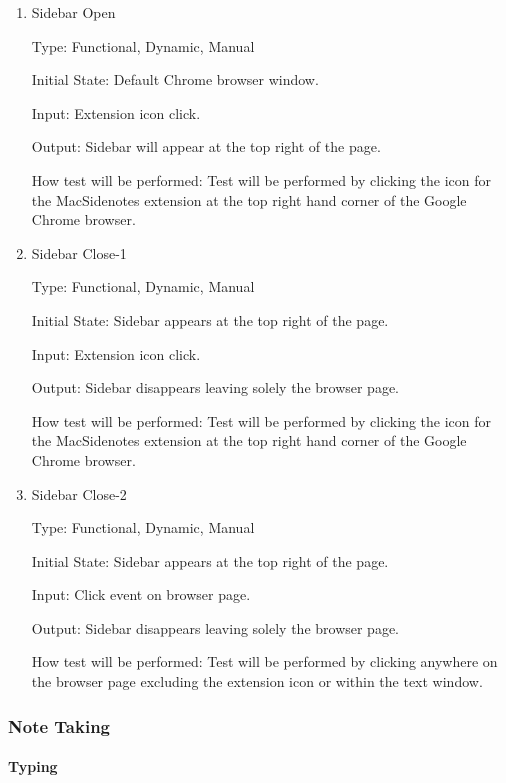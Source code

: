 \documentclass[12pt, titlepage]{article}
\begin{document}
\begin{enumerate}

\item{Sidebar Open\\}

Type: Functional, Dynamic, Manual
					
Initial State: Default Chrome browser window.
					
Input: Extension icon click.
					
Output: Sidebar will appear at the top right of the page.
					
How test will be performed: Test will be performed by clicking the icon for the 
MacSidenotes extension at the top right hand corner of the Google Chrome browser.
					
\item{Sidebar Close-1\\}

Type: Functional, Dynamic, Manual
					
Initial State: Sidebar appears at the top right of the page.
					
Input: Extension icon click.
					
Output: Sidebar disappears leaving solely the browser page.
					
How test will be performed: Test will be performed by clicking the icon for the 
MacSidenotes extension at the top right hand corner of the Google Chrome browser.

\item{Sidebar Close-2\\}

Type: Functional, Dynamic, Manual

Initial State: Sidebar appears at the top right of the page.

Input: Click event on browser page.

Output: Sidebar disappears leaving solely the browser page.

How test will be performed: Test will be performed by clicking anywhere on the 
browser page excluding the extension icon or within the text window.

\end{enumerate}

\subsubsection{Note Taking}

\paragraph{Typing}
\end{document}

